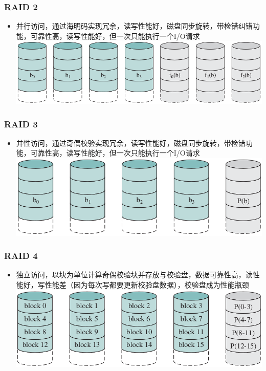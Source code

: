 \documentclass[xcolor=svgnames,presentation]{beamer}
\begin{document}
\begin{frame}
\frametitle{RAID 2}
\label{sec-4-4}
\begin{itemize}

\item 并行访问，通过海明码实现冗余，读写性能好，磁盘同步旋转，带检错纠错功能，可靠性高，读写性能好，但一次只能执行一个I/O请求\\
\label{sec-4-4-1}%
\includegraphics[width=.9\linewidth]{img/raid2.png}
\end{itemize} %
\end{frame}
\begin{frame}
\frametitle{RAID 3}
\label{sec-4-5}
\begin{itemize}

\item 并性访问，通过奇偶校验实现冗余，读写性能好，磁盘同步旋转，带检错功能，可靠性高，读写性能好，但一次只能执行一个I/O请求\\
\label{sec-4-5-1}%
\includegraphics[width=.9\linewidth]{img/raid3.png}
\end{itemize} %
\end{frame}
\begin{frame}
\frametitle{RAID 4}
\label{sec-4-6}
\begin{itemize}

\item 独立访问，以块为单位计算奇偶校验块并存放与校验盘，数据可靠性高，读性能好，写性能差（因为每次写都要更新校验盘数据），校验盘成为性能瓶颈\\
\label{sec-4-6-1}%
\includegraphics[width=.9\linewidth]{img/raid4.png}
\end{itemize} %
\end{frame}
\end{document}
